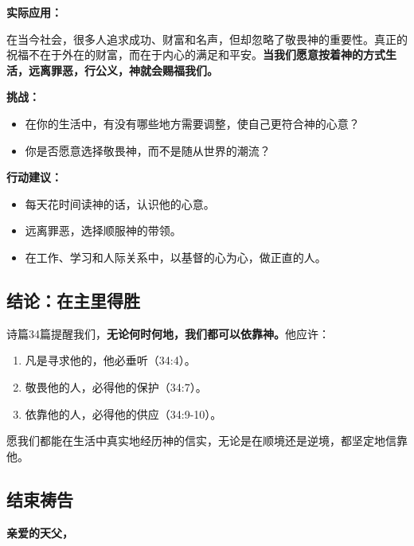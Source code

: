 \documentclass[a4paper, 12pt]{article}
\begin{document}
\vspace{0.2cm}

\textbf{实际应用：}

在当今社会，很多人追求成功、财富和名声，但却忽略了敬畏神的重要性。真正的祝福不在于外在的财富，而在于内心的满足和平安。\textbf{当我们愿意按着神的方式生活，远离罪恶，行公义，神就会赐福我们。}

\vspace{0.2cm}

\textbf{挑战：}
\begin{itemize}
    \item 在你的生活中，有没有哪些地方需要调整，使自己更符合神的心意？

    \item 你是否愿意选择敬畏神，而不是随从世界的潮流？

\end{itemize}


\textbf{行动建议：}
\begin{itemize}
    \item 每天花时间读神的话，认识他的心意。

    \item 远离罪恶，选择顺服神的带领。

    \item 在工作、学习和人际关系中，以基督的心为心，做正直的人。

\end{itemize}

\subsection*{结论：在主里得胜}
\hspace{0.6cm}诗篇34篇提醒我们，\textbf{无论何时何地，我们都可以依靠神。}他应许：
\begin{enumerate}
    \leftskip=0.7cm
    \item 凡是寻求他的，他必垂听（34:4）。
    \item 敬畏他的人，必得他的保护（34:7）。

    \item 依靠他的人，必得他的供应（34:9-10）。

\end{enumerate}

愿我们都能在生活中真实地经历神的信实，无论是在顺境还是逆境，都坚定地信靠他。

\subsection*{结束祷告}
\textbf{亲爱的天父，}
\end{document}
